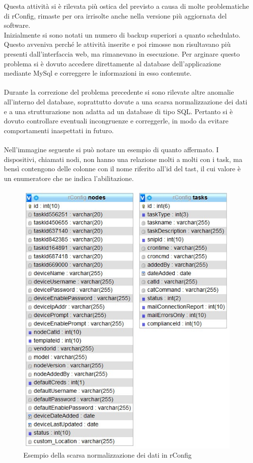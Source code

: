 \documentclass[Realizzazione.tex]{subfiles}
\begin{document}
Questa attività si è rilevata più ostica del previsto a causa di molte problematiche di rConfig, rimaste per ora irrisolte anche nella versione più aggiornata del software. \\
Inizialmente si sono notati un numero di backup superiori a quanto schedulato. Questo avveniva perché le attività inserite e poi rimosse non risultavano più presenti dall'interfaccia web, ma rimanevano in esecuzione. Per arginare questo problema si è dovuto accedere direttamente al database dell'applicazione mediante MySql e correggere le informazioni in esso contenute. \\\\
Durante la correzione del problema precedente si sono rilevate altre anomalie all'interno del database, soprattutto dovute a una scarsa normalizzazione dei dati e a una strutturazione non adatta ad un database di tipo SQL. Pertanto si è dovuto controllare eventuali incongruenze e correggerle, in modo da evitare comportamenti inaspettati in futuro. \\\\
Nell'immagine seguente si può notare un esempio di quanto affermato. I dispositivi, chiamati nodi, non hanno una relazione molti a molti con i task, ma bensì contengono delle colonne con il nome riferito all'id del tast, il cui valore è un enumeratore che ne indica l'abilitazione.
\begin{figure}[H]
	\centering
	\includegraphics[width=0.6\linewidth]{"images/rconfig_normalizzazione"}
	\caption{Esempio della scarsa normalizzazione dei dati in rConfig}
	\label{fig:Esempio della scarsa normalizzazione dei dati in rConfig}
\end{figure}
\end{document}
